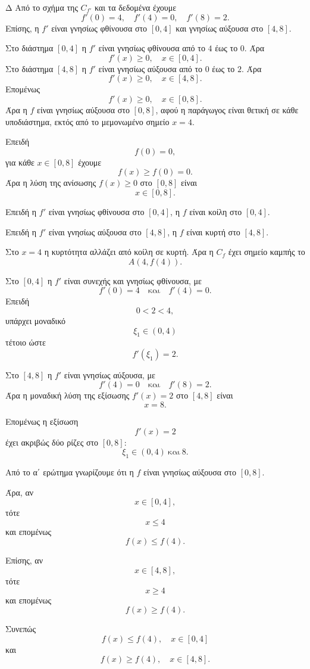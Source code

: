 \begin{thema}{Δ}
Από το σχήμα της $C_{f'}$ και τα δεδομένα έχουμε
\[
f'(0)=4,\quad f'(4)=0,\quad f'(8)=2.
\]
Επίσης, η $f'$ είναι γνησίως φθίνουσα στο $[0,4]$ και γνησίως αύξουσα
στο $[4,8]$.

\begin{erwthma}
\item Στο διάστημα $[0,4]$ η $f'$ είναι γνησίως φθίνουσα από το $4$ έως
το $0$. Άρα
\[
f'(x)\geq 0,\quad x\in[0,4].
\]
Στο διάστημα $[4,8]$ η $f'$ είναι γνησίως αύξουσα από το $0$ έως το
$2$. Άρα
\[
f'(x)\geq 0,\quad x\in[4,8].
\]
Επομένως
\[
f'(x)\geq 0,\quad x\in[0,8].
\]
Άρα η $f$ είναι γνησίως αύξουσα στο $[0,8]$, αφού η παράγωγος είναι
θετική σε κάθε υποδιάστημα, εκτός από το μεμονωμένο σημείο $x=4$.

Επειδή
\[
f(0)=0,
\]
για κάθε $x\in[0,8]$ έχουμε
\[
f(x)\geq f(0)=0.
\]
Άρα η λύση της ανίσωσης $f(x)\geq 0$ στο $[0,8]$ είναι
\[
{x\in[0,8]}.
\]

\item Επειδή η $f'$ είναι γνησίως φθίνουσα στο $[0,4]$, η $f$ είναι
κοίλη στο $[0,4]$.

Επειδή η $f'$ είναι γνησίως αύξουσα στο $[4,8]$, η $f$ είναι κυρτή στο
$[4,8]$.

Στο $x=4$ η κυρτότητα αλλάζει από κοίλη σε κυρτή. Άρα η $C_f$ έχει
σημείο καμπής το
\[
{A(4,f(4))}.
\]

\item Στο $[0,4]$ η $f'$ είναι συνεχής και γνησίως φθίνουσα, με
\[
f'(0)=4
\quad\text{και}\quad
f'(4)=0.
\]
Επειδή
\[
0<2<4,
\]
υπάρχει μοναδικό
\[
\xi_1\in(0,4)
\]
τέτοιο ώστε
\[
f'(\xi_1)=2.
\]

Στο $[4,8]$ η $f'$ είναι γνησίως αύξουσα, με
\[
f'(4)=0
\quad\text{και}\quad
f'(8)=2.
\]
Άρα η μοναδική λύση της εξίσωσης $f'(x)=2$ στο $[4,8]$ είναι
\[
x=8.
\]

Επομένως η εξίσωση
\[
f'(x)=2
\]
έχει ακριβώς δύο ρίζες στο $[0,8]$:
\[
{\xi_1\in(0,4)\ \text{και}\ 8}.
\]

\item Από το α΄ ερώτημα γνωρίζουμε ότι η $f$ είναι γνησίως αύξουσα στο
$[0,8]$.

Άρα, αν
\[
x\in[0,4],
\]
τότε
\[
x\leq 4
\]
και επομένως
\[
f(x)\leq f(4).
\]

Επίσης, αν
\[
x\in[4,8],
\]
τότε
\[
x\geq 4
\]
και επομένως
\[
f(x)\geq f(4).
\]

Συνεπώς
\[
{f(x)\leq f(4),\quad x\in[0,4]}
\]
και
\[
{f(x)\geq f(4),\quad x\in[4,8]}.
\]
\end{erwthma}
\end{thema}

